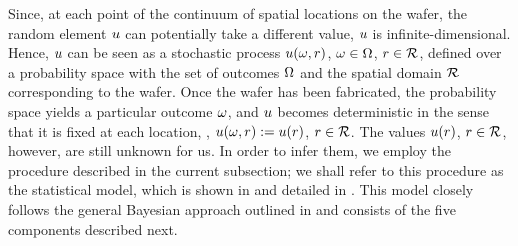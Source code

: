
Since, at each point of the continuum of spatial locations on the wafer, the random element $u$ can potentially take a different value, $u$ is infinite-dimensional.
Hence, $u$ can be seen as a stochastic process $u(\omega, r)$, $\omega \in \Omega$, $r \in \mathcal{R}$, defined over a probability space with the set of outcomes $\Omega$ \cite{durrett2010} and the spatial domain $\mathcal{R}$ corresponding to the wafer.
Once the wafer has been fabricated, the probability space yields a particular outcome $\omega$, and $u$ becomes deterministic in the sense that it is fixed at each location, \ie, $u(\omega, r) := u(r)$, $r \in \mathcal{R}$.
The values $u(r)$, $r \in \mathcal{R}$, however, are still unknown for us.
In order to infer them, we employ the procedure described in the current subsection; we shall refer to this procedure as the statistical model, which is shown in  and detailed in . This model closely follows the general Bayesian approach outlined in  and consists of the five components described next.

